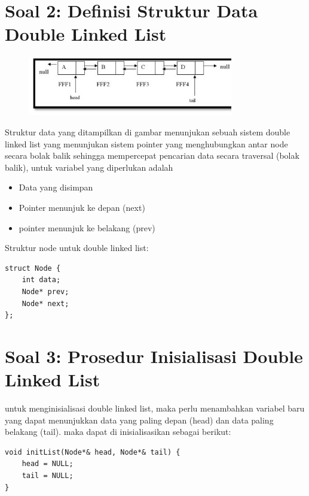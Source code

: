 \documentclass[12pt,a4paper]{article}
\begin{document}
\vspace{1cm}

\section{Soal 2: Definisi Struktur Data Double Linked List}
\begin{figure}[H]
  \begin{center}
    \includegraphics[width=0.8\textwidth]{images/gambar2.jpg}
  \end{center}
\end{figure}
Struktur data yang ditampilkan di gambar menunjukan sebuah sistem double linked list yang menunjukan sistem pointer yang menghubungkan antar node secara bolak balik sehingga mempercepat pencarian data secara traversal (bolak balik), untuk variabel yang diperlukan adalah 
\begin{itemize}
  \item Data yang disimpan 
  \item Pointer menunjuk ke depan (next) 
  \item pointer menunjuk ke belakang (prev)
\end{itemize}
Struktur node untuk double linked list:

\begin{verbatim}
struct Node {
    int data;
    Node* prev;
    Node* next;
};
\end{verbatim}



\vspace{1cm}

\section{Soal 3: Prosedur Inisialisasi Double Linked List}

untuk menginisialisasi double linked list, maka perlu menambahkan variabel baru yang dapat menunjukkan data yang paling depan (head) dan data paling belakang (tail). maka dapat di inisialisasikan sebagai berikut:

\begin{verbatim}
void initList(Node*& head, Node*& tail) {
    head = NULL;
    tail = NULL;
}
\end{verbatim}
\end{document}
